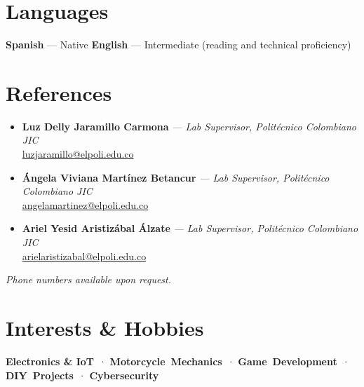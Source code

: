 \documentclass[11pt, a4paper]{article}
\begin{document}
\section{Languages}

\noindent\textbf{Spanish} — Native \hfill \textbf{English} — Intermediate (reading and technical proficiency)

\section{References}

\begin{itemize}[leftmargin=0pt, label={}, itemsep=6pt]
  \item \textbf{Luz Delly Jaramillo Carmona} \textit{— Lab Supervisor, Politécnico Colombiano JIC}\\
        \href{mailto:luzjaramillo@elpoli.edu.co}{luzjaramillo@elpoli.edu.co}
  \item \textbf{Ángela Viviana Martínez Betancur} \textit{— Lab Supervisor, Politécnico Colombiano JIC}\\
        \href{mailto:angelamartinez@elpoli.edu.co}{angelamartinez@elpoli.edu.co}
  \item \textbf{Ariel Yesid Aristizábal Álzate} \textit{— Lab Supervisor, Politécnico Colombiano JIC}\\
        \href{mailto:arielaristizabal@elpoli.edu.co}{arielaristizabal@elpoli.edu.co}
\end{itemize}
\small\textit{Phone numbers available upon request.}\normalsize

\section{Interests \& Hobbies}

\noindent
\textbf{Electronics \& IoT}~· \mbox{\textbf{Motorcycle Mechanics}}~· \mbox{\textbf{Game Development}}~· \mbox{\textbf{DIY Projects}}~· \mbox{\textbf{Cybersecurity}}
\end{document}
